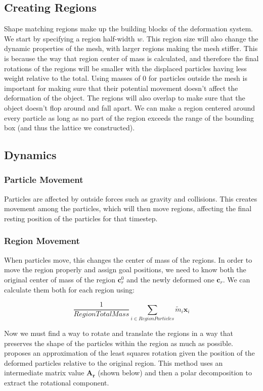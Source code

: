 \documentclass[12pt,a4paper]{amsart}
\begin{document}
	\subsection{Creating Regions}
	Shape matching regions make up the building blocks of the deformation system. We start by specifying a region half-width $w$. This region size will also change the dynamic properties of the mesh, with larger regions making the mesh stiffer. This is because the way that region center of mass is calculated, and therefore the final rotations of the regions will be smaller with the displaced particles having less weight relative to the total. Using masses of 0 for particles outside the mesh is important for making sure that their potential movement doesn't affect the deformation of the object. The regions will also overlap to make sure that the object doesn't flop around and fall apart. We can make a region centered around every particle as long as no part of the region exceeds the range of the bounding box (and thus the lattice we constructed).
	
	\subsection{Dynamics}
	
	\subsubsection{Particle Movement}
	Particles are affected by outside forces such as gravity and collisions. This creates movement among the particles, which will then move regions, affecting the final resting position of the particles for that timestep. 
	
	\subsubsection{Region Movement}
	When particles move, this changes the center of mass of the regions. In order to move the region properly and assign goal positions, we need to know both the original center of mass of the region $\mathbf{c}_r^0$ and the newly deformed one $\mathbf{c}_r$. We can calculate them both for each region using:
	
	\[ \frac{1}{Region Total Mass} \sum_{i \in Region Particles} \tilde{m}_i \mathbf{x}_i\]
	
	Now we must find a way to rotate and translate the regions in a way that preserves the shape of the particles within the region as much as possible.\cite{rivers} proposes an approximation of the least squares rotation given the position of the deformed particles relative to the original region. This method uses an intermediate matrix value $\mathbf{A_r}$ (shown below) and then a polar decomposition to extract the rotational component.
	
\end{document}

